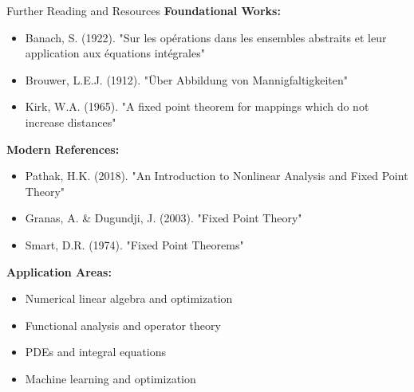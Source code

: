 \documentclass[aspectratio=169,10pt]{beamer}
\begin{document}
\begin{frame}{Further Reading and Resources}
    \textbf{Foundational Works:}
    \begin{itemize}
        \item Banach, S. (1922). "Sur les opérations dans les ensembles abstraits et leur application aux équations intégrales"
        \item Brouwer, L.E.J. (1912). "Über Abbildung von Mannigfaltigkeiten"
        \item Kirk, W.A. (1965). "A fixed point theorem for mappings which do not increase distances"
    \end{itemize}

    \vspace{0.3cm}
    \textbf{Modern References:}
    \begin{itemize}
        \item Pathak, H.K. (2018). "An Introduction to Nonlinear Analysis and Fixed Point Theory"
        \item Granas, A. \& Dugundji, J. (2003). "Fixed Point Theory"
        \item Smart, D.R. (1974). "Fixed Point Theorems"
    \end{itemize}

    \vspace{0.3cm}
    \textbf{Application Areas:}
    \begin{itemize}
        \item Numerical linear algebra and optimization
        \item Functional analysis and operator theory
        \item PDEs and integral equations
        \item Machine learning and optimization
    \end{itemize}
\end{frame}
\end{document}
